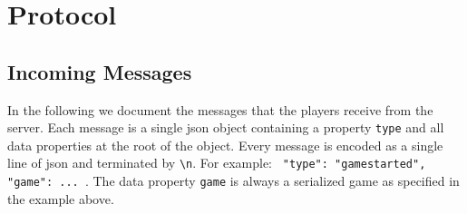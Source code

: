 \documentclass{scrartcl}
\begin{document}
\begin{mdframed}[frametitle = {Example}]
\begin{center}
  \end{center}
\end{mdframed}


\section{Protocol}

\subsection{Incoming Messages}
In the following we document the messages that the players receive from the
server. Each message is a single json object containing a property \texttt{type}
and all data properties at the root of the object.
Every message is encoded as a single line of json and terminated by
\texttt{\textbackslash n}. For example:
\texttt{{ "type": "gamestarted", "game": {...} }}.
The data property \texttt{game} is always a serialized game as
specified in the example above.
\end{document}
